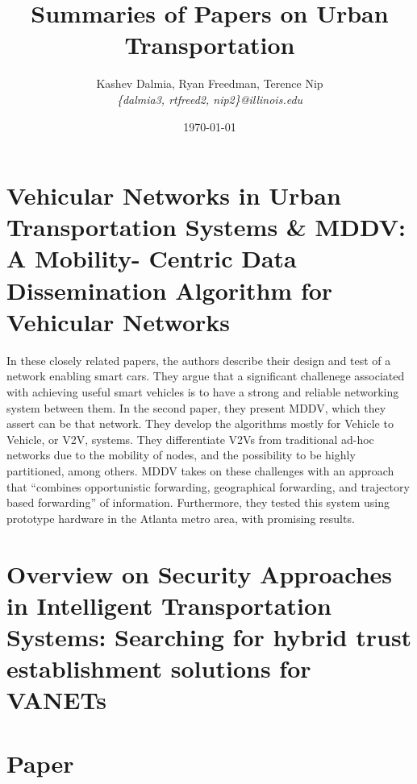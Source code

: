 \documentclass[a4paper]{article}
\title{Summaries of Papers on Urban Transportation}
\author{Kashev Dalmia, Ryan Freedman, Terence Nip \\
        \textit{\{dalmia3, rtfreed2, nip2\}@illinois.edu}
       }
\date{\today}
\begin{document}
\maketitle

\section{Vehicular Networks in Urban Transportation Systems \& MDDV: A Mobility-
Centric Data Dissemination Algorithm for Vehicular Networks}

In these closely related papers, the authors describe their design and test of a
network enabling smart cars. They argue that a significant challenege associated
with achieving useful smart vehicles is to have a strong and reliable networking
system between them. In the second paper, they present MDDV, which they assert
can be that network. They develop the algorithms mostly for Vehicle to Vehicle,
or V2V, systems. They differentiate V2Vs from traditional ad-hoc networks due to
the mobility of nodes, and the possibility to be highly partitioned, among
others. MDDV takes on these challenges with an approach that ``combines
opportunistic forwarding, geographical forwarding, and trajectory based
forwarding'' of information. Furthermore, they tested this system using
prototype hardware in the Atlanta metro area, with promising results.

\section{Overview on Security Approaches in Intelligent Transportation Systems: Searching for hybrid trust establishment solutions for VANETs}
\section{Paper}
\end{document}

